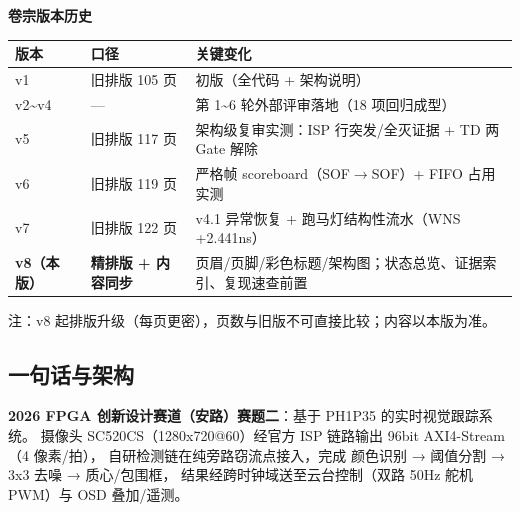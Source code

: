 \documentclass[10pt]{ctexart}
\begin{document}
\textbf{卷宗版本历史}
\begin{center}
{\small
\begin{tabular}{p{1.8cm}p{3.0cm}p{11.6cm}}
\toprule
\rowcolor{rowtint}\textbf{版本} & \textbf{口径} & \textbf{关键变化} \\
\midrule
v1 & 旧排版 105 页 & 初版（全代码 + 架构说明）\\
v2\~{}v4 & --- & 第 1\~{}6 轮外部评审落地（18 项回归成型）\\
v5 & 旧排版 117 页 & 架构级复审实测：ISP 行突发/全灭证据 + TD 两 Gate 解除\\
v6 & 旧排版 119 页 & 严格帧 scoreboard（SOF$\to$SOF）+ FIFO 占用实测 \\
v7 & 旧排版 122 页 & v4.1 异常恢复 + 跑马灯结构性流水（WNS +2.441ns）\\
\textbf{v8（本版）} & \textbf{精排版 + 内容同步} & 页眉/页脚/彩色标题/架构图；状态总览、证据索引、复现速查前置 \\
\bottomrule
\end{tabular}}
\end{center}
{\small\color{black!55} 注：v8 起排版升级（每页更密），页数与旧版不可直接比较；内容以本版为准。}

\subsection{一句话与架构}

\textbf{2026 FPGA 创新设计赛道（安路）赛题二}：基于 PH1P35 的实时视觉跟踪系统。
摄像头 SC520CS（1280x720@60）经官方 ISP 链路输出 96bit AXI4-Stream（4 像素/拍），
自研检测链在纯旁路窃流点接入，完成 颜色识别 → 阈值分割 → 3x3 去噪 → 质心/包围框，
结果经跨时钟域送至云台控制（双路 50Hz 舵机 PWM）与 OSD 叠加/遥测。
\end{document}
